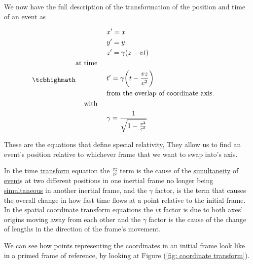 We now have the full description of the transformation of the position and time of an \hyperlink{def-event}{event} as

\begin{equation}
	\mhl{
		\begin{aligned}
			 & {x{'}} = x                                           \\
			 & {y{'}} = y                                           \\
			 & {z{'}} = {\gamma} ({z}-{v}{t})                       \\
			\text{at time \ \ \ }                                   \\
			 & {t{'}} = {\gamma} \bigg(t-\frac{{v}{z}}{{c}^2}\bigg) \\
			 & \text{from the overlap of coordinate axis. \ \ \ }   \\
			\text{with \ \ \ }                                      \\
			 & {\gamma} = \dfrac{1}{\sqrt{1-\frac{{v}^2}{{c}^2}}}
		\end{aligned}
	}
	\label{eq: Lorentz transformation}
\end{equation}

These are the equations that define special relativity, They allow us to find an event's position relative to whichever frame that we want to swap into's axis.

In the time \hyperlink{def-transform}{transform} equation the $\frac{{v}{z}}{{c}^2}$ term is the cause of the \hyperlink{def-simultaneity}{simultaneity} of \hyperlink{def-event}{event}s at two different positions in one inertial frame no longer being \hyperlink{def-simultaneity}{simultaneous} in another inertial frame, and the ${\gamma}$ factor, is the term that causes the overall change in how fast time flows at a point relative to the initial frame.
In the spatial coordinate transform equations the ${v}{t}$ factor is due to both axes' origins moving away from each other and the ${\gamma}$ factor is the cause of the change of lengths in the direction of the frame's movement.

We can see how points representing the coordinates in an initial frame look like in a primed frame of reference, by looking at Figure (\ref{fig: coordinate transform}).


